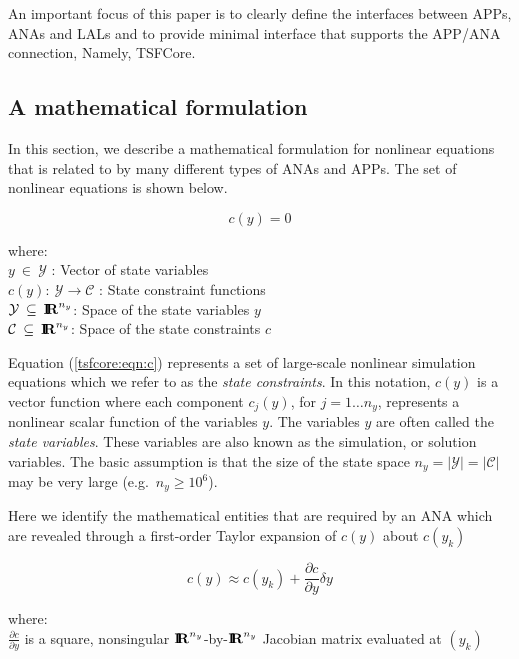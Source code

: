 \documentclass[10pt,fleqn]{article}
\begin{document}
An important focus of this paper is to clearly define the interfaces between APPs, ANAs 
and LALs and to provide minimal interface that supports the APP/ANA connection, Namely,
TSFCore.

%

%
\subsection{A mathematical formulation}
\label{tsfcore:sec:math}
%

In this section, we describe a mathematical formulation for nonlinear
equations that is related to by many different types of ANAs and APPs.
The set of nonlinear equations is shown below.

{\bsinglespace
\begin{equation}
c(y)  = 0
\label{tsfcore:eqn:c}
\end{equation}
\begin{tabbing}
\hspace{\mathindent}where:\hspace{5ex}\= \\
\>	$y \:\in\:\mathcal{Y}$ : Vector of state variables \\
\>	$c(y) : \:\mathcal{Y} \rightarrow \mathcal{C}$ : State constraint functions \\
\>	$\mathcal{Y} \:\subseteq\:\mbox{\textbf{I}}\hspace{-0.6ex}\mbox{\textbf{R}}^{n_y}$: Space of the state variables $y$ \\
\>	$\mathcal{C} \:\subseteq\:\mbox{\textbf{I}}\hspace{-0.6ex}\mbox{\textbf{R}}^{n_y}$: Space of the state constraints $c$
\end{tabbing}
\esinglespace}

Equation (\ref{tsfcore:eqn:c}) represents a set of large-scale
nonlinear simulation equations which we refer to as the \textit{state
constraints}.  In this notation, $c(y)$ is a vector function where
each component $c_j(y)$, for $j = 1 \ldots n_y$, represents a
nonlinear scalar function of the variables $y$.  The variables $y$ are
often called the {\em state variables}.  These variables are also
known as the simulation, or solution variables.  The basic assumption
is that the size of the state space $n_y = |\mathcal{Y}| =
|\mathcal{C}|$ may be very large (e.g.~$n_y \ge 10^{6}$).

Here we identify the mathematical entities that are required by an ANA
which are revealed through a first-order Taylor expansion of $c(y)$
about $c(y_k)$

\begin{equation}
c(y) \approx c(y_k) + \frac{\partial c}{\partial y} \delta y
\label{tsfcore:eqn:c_taylor}
\end{equation}
\begin{tabbing}
\hspace{\mathindent}where:\hspace{5ex}\= \\
\>	$\frac{\partial c}{\partial y}$ is a square, nonsingular $\mbox{\textbf{I}}\hspace{-0.6ex}\mbox{\textbf{R}}^{n_y}$-by-$\mbox{\textbf{I}}\hspace{-0.6ex}\mbox{\textbf{R}}^{n_y}$
    Jacobian matrix evaluated at $(y_k)$
\end{tabbing}
\end{document}

